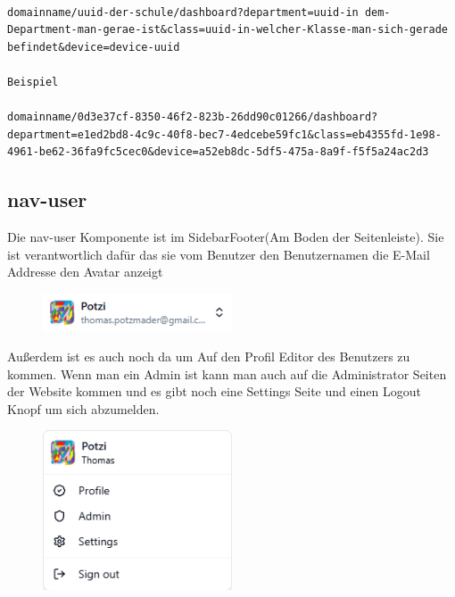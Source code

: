 \begin{inhalt}
\begin{enumerate}[label=\textbf{\arabic*.}]
\begin{lstlisting}[language=mytsx]

domainname/uuid-der-schule/dashboard?department=uuid-in dem-Department-man-gerae-ist&class=uuid-in-welcher-Klasse-man-sich-gerade befindet&device=device-uuid

Beispiel

domainname/0d3e37cf-8350-46f2-823b-26dd90c01266/dashboard?department=e1ed2bd8-4c9c-40f8-bec7-4edcebe59fc1&class=eb4355fd-1e98-4961-be62-36fa9fc5cec0&device=a52eb8dc-5df5-475a-8a9f-f5f5a24ac2d3
\end{lstlisting}



\subsection{nav-user}

Die nav-user Komponente ist im SidebarFooter(Am Boden der Seitenleiste). Sie ist verantwortlich dafür das sie vom Benutzer den Benutzernamen die E-Mail Addresse den Avatar anzeigt

\begin{figure}[!htb]
\centering
\includegraphics[width=0.5\textwidth]{files/Thomas/pics/Website/Sidebar/nav-user/user-component.png}
\caption[Bildbezeichnung für Abbildungsverzeichnis]{}
\label{fig:gehaeuse_internet_bild}
\end{figure}


Außerdem ist es auch noch da um Auf den Profil Editor des Benutzers zu kommen. Wenn man ein Admin ist kann man auch auf die Administrator Seiten der Website kommen und es gibt noch eine Settings Seite und einen Logout Knopf um sich abzumelden. 

\begin{figure}[!htb]
\centering
\includegraphics[width=0.5\textwidth]{files/Thomas/pics/Website/Sidebar/nav-user/user-component-open.png}
\caption[Bildbezeichnung für Abbildungsverzeichnis]{}
\label{fig:gehaeuse_internet_bild}
\end{figure}




\end{enumerate}
\end{inhalt}
